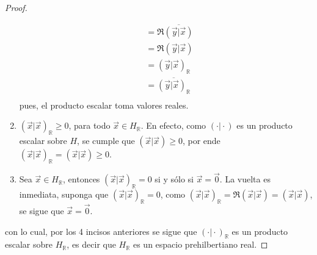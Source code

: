 \documentclass[12pt]{report}
\newcounter{it}
\theoremstyle{largebreak}
\newcommand\pint[2]{\ensuremath{\left(#1\big|#2\right)}}
\newcommand\conj[1]{\ensuremath{\overline{#1}}}
\begin{document}
\begin{proof}
\begin{enumerate}
\begin{equation*}
\begin{split}
                    &=\Re\conj{\pint{\vec{y}}{\vec{x}}} \\
                    &=\Re\pint{\vec{y}}{\vec{x}} \\
                    &=\pint{\vec{y}}{\vec{x}}_{\mathbb{R}}\\
                    &=\conj{\pint{\vec{y}}{\vec{x}}_{\mathbb{R}}}\\
                \end{split}
            \end{equation*}
            pues, el producto escalar toma valores reales.
            \item $\pint{\vec{x}}{\vec{x}}_{\mathbb{R}}\geq0$, para todo $\vec{x}\in H_{\mathbb{R}}$. En efecto, como $\pint{\cdot}{\cdot}$ es un producto escalar sobre $H$, se cumple que $\pint{\vec{x}}{\vec{x}}\geq0$, por ende $\pint{\vec{x}}{\vec{x}}_{\mathbb{R}}=\pint{\vec{x}}{\vec{x}}\geq0$.
            \item Sea $\vec{x}\in H_{\mathbb{R}}$, entonces $\pint{\vec{x}}{\vec{x}}_{\mathbb{R}}=0$ si y sólo si $\vec{x}=\vec{0}$. La vuelta es inmediata, suponga que $\pint{\vec{x}}{\vec{x}}_{\mathbb{R}}=0$, como $\pint{\vec{x}}{\vec{x}}_{\mathbb{R}}=\Re\pint{\vec{x}}{\vec{x}}=\pint{\vec{x}}{\vec{x}}$, se sigue que $\vec{x}=\vec{0}$.
        \end{enumerate}
        con lo cual, por los 4 incisos anteriores se sigue que $\pint{\cdot}{\cdot}_{\mathbb{R}}$ es un producto escalar sobre $H_{\mathbb{R}}$, es decir que $H_{\mathbb{R}}$ es un espacio prehilbertiano real.
        

\end{proof}
\end{document}
